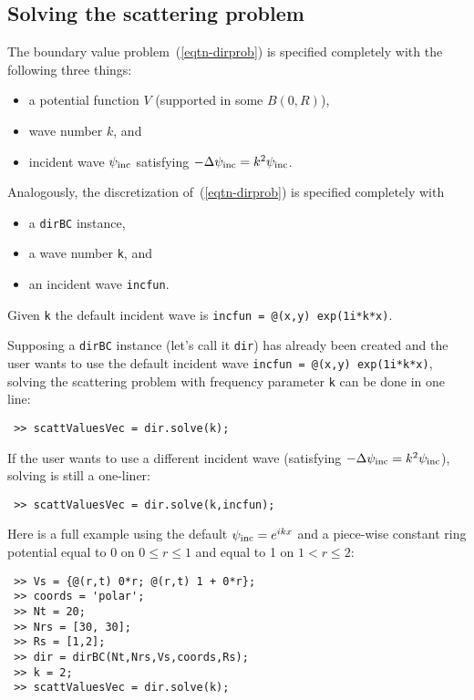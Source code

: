 \subsection{Solving the scattering problem}
\label{sec-dirBC-solvescattprob}

The boundary value problem~(\ref{eqtn-dirprob})
is specified completely with the following three things:
\begin{itemize}
 \item a potential function $V$ (supported in some $B(0,R)$),
 \item wave number $k$, and
 \item incident wave $\psi_{\text{inc}}$ satisfying $-\Delta\psi_{\text{inc}} = k^2 \psi_{\text{inc}}$.
\end{itemize}
Analogously, 
the discretization of~(\ref{eqtn-dirprob}) is specified completely
with 
\begin{itemize}
 \item a {\tt dirBC} instance, 
 \item a wave number {\tt k}, and 
 \item an incident wave {\tt incfun}. 
\end{itemize}
Given {\tt k} the default incident wave
is {\tt incfun = @(x,y) exp(1i*k*x)}.

Supposing a {\tt dirBC} instance (let's call it {\tt dir}) 
has already been created and the user
wants to use the default incident wave {\tt incfun = @(x,y) exp(1i*k*x)},
solving the scattering problem with frequency parameter
{\tt k} can be done in one line:
\begin{verbatim}
 >> scattValuesVec = dir.solve(k);
\end{verbatim}

If the user wants to use a different incident wave (satisfying
$-\Delta\psi_{\text{inc}} = k^2\psi_{\text{inc}}$), solving is still a one-liner:
\begin{verbatim}
 >> scattValuesVec = dir.solve(k,incfun);
\end{verbatim}

Here is 
a full example using the default $\psi_{\text{inc}} = e^{ikx}$ and a piece-wise
constant ring potential equal to 0 on $0 \le r \le 1$ and
equal to 1 on $1 < r \le 2$:
\begin{verbatim}
 >> Vs = {@(r,t) 0*r; @(r,t) 1 + 0*r};
 >> coords = 'polar';
 >> Nt = 20;
 >> Nrs = [30, 30];
 >> Rs = [1,2];
 >> dir = dirBC(Nt,Nrs,Vs,coords,Rs);
 >> k = 2;
 >> scattValuesVec = dir.solve(k);
\end{verbatim}
